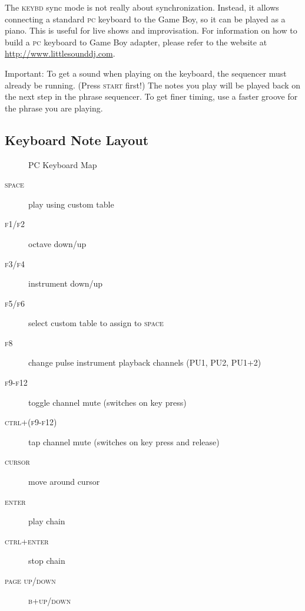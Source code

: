 The \textsc{keybd} sync mode is not really about synchronization. Instead, it allows connecting a standard \textsc{pc} keyboard to the Game Boy, so it can be played as a piano. This is useful for live shows and improvisation. For information on how to build a \textsc{pc} keyboard to Game Boy adapter, please refer to the website at \url{http://www.littlesounddj.com}.

Important: To get a sound when playing on the keyboard, the sequencer must already be running. (Press \textsc{start} first!) The notes you play will be played back on the next step in the phrase sequencer. To get finer timing, use a faster groove for the phrase you are playing.

\subsection{Keyboard Note Layout}

\begin{figure}[htpb]
	\begin{center}
	\end{center}
	\caption{PC Keyboard Map}
	\label{fig:keybd-map}
\end{figure}

\begin{description}
\item[\textsc{space}] play using custom table
\item[\textsc{f1/f2}] octave down/up
\item[\textsc{f3/f4}] instrument down/up
\item[\textsc{f5/f6}] select custom table to assign to \textsc{space}
\item[\textsc{f8}] change pulse instrument playback channels (\textsc{PU1, PU2, PU1+2})
\item[\textsc{f9-f12}] toggle channel mute (switches on key press)
\item[\textsc{ctrl+(f9-f12)}] tap channel mute (switches on key press and release)
\item[\textsc{cursor}] move around cursor
\item[\textsc{enter}] play chain
\item[\textsc{ctrl+enter}] stop chain
\item[\textsc{page up/down}] \textsc{b+up/down}
\end{description}

